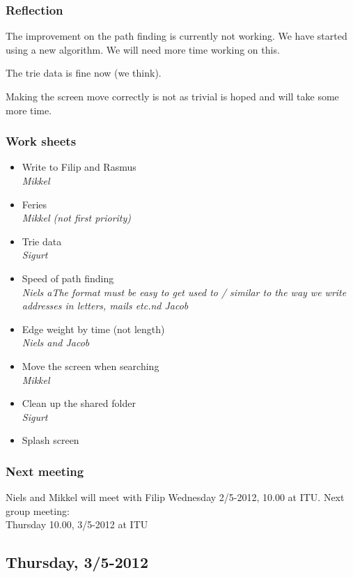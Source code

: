 \documentclass[a4paper,11pt]{article}
\begin{document}
\subsubsection*{Reflection}
The improvement on the path finding is currently not working. We have started using a new algorithm. We will need more time working on this.

The trie data is fine now (we think).

Making the screen move correctly is not as trivial is hoped and will take some more time.

\subsubsection*{Work sheets}
\begin{itemize}
	\item Write to Filip and Rasmus \\
		\textsl{Mikkel}
	\item Feries \\
		\textsl{Mikkel (not first priority)}
	\item Trie data \\
		\textsl{Sigurt}
	\item Speed of path finding \\
		\textsl{Niels aThe \textit{format} must be easy to get used to / similar to the way we write addresses in letters, mails etc.nd Jacob}
	\item Edge weight by time (not length) \\
		\textsl{Niels and Jacob}
	\item Move the screen when searching \\
		\textsl{Mikkel}
	\item Clean up the shared folder \\
		\textsl{Sigurt}
	\item Splash screen
\end{itemize}

\subsubsection*{Next meeting}
Niels and Mikkel will meet with Filip Wednesday 2/5-2012, 10.00 at ITU.
Next group meeting: \\
Thursday 10.00, 3/5-2012 at ITU


\pagebreak
\subsection{Thursday, 3/5-2012}
\end{document}
